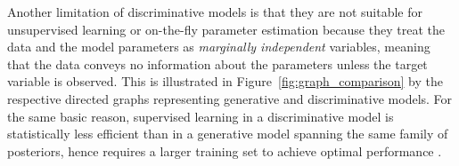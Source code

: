 \documentclass[english]{scrartcl}
\begin{document}



Another limitation of discriminative models is that they are not suitable for unsupervised learning or on-the-fly parameter estimation because they treat the data and the model parameters as {\em marginally independent} variables, meaning that the data conveys no information about the parameters unless the target variable is observed. This is illustrated in Figure~\ref{fig:graph_comparison} by the respective directed graphs representing generative and discriminative models. For the same basic reason, supervised learning in a discriminative model is statistically less efficient than in a generative model spanning the same family of posteriors, hence requires a larger training set to achieve optimal performance \cite{Ng-01}. 


\end{document}
